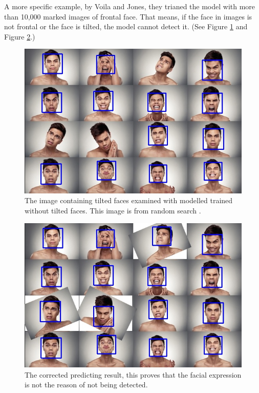 \documentclass[10pt,twocolumn,letterpaper]{article}
\begin{document}
A more specific example, by Voila and Jones, they trianed the model with more than 10,000 marked images of frontal face.
That means, if the face in images is not frontal or the face is tilted, the model cannot detect it. (See Figure \ref{fig:tilt} and Figure \ref{fig:tiltcor}.)

\begin{figure}[t]
    \begin{center}
        \includegraphics[width=0.9\linewidth]{facial1}
    \end{center}
    \caption{The image containing tilted faces examined with modelled trained without tilted faces. This image is from random search \cite{facialimg}.}
    \label{fig:tilt}
\end{figure}

\begin{figure}[t]
    \begin{center}
        \includegraphics[width=0.9\linewidth]{facial1_corrected}
    \end{center}
    \caption{The corrected predicting result, this proves that the facial expression is not the reason of not being detected.}
    \label{fig:tiltcor}
\end{figure}
\end{document}
